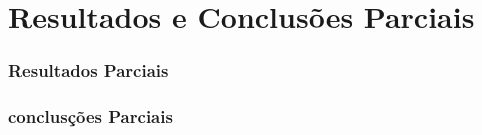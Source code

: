 \chapter{Resultados e Conclus\~{o}es Parciais}


\subsection*{Resultados Parciais}


\subsection*{conclus\c{c}\~{o}es Parciais}





